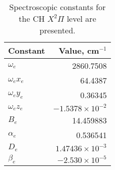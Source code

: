 \begin{table}
  \caption[Spectroscopic constants]{Spectroscopic constants for the CH \(X^2\Pi\) level are presented.}
  \begin{center}
    \begin{tabular}{lr}
      Constant & Value, cm\(^{-1}\) \tabularnewline
      \hline\hline
      \(\omega_e\) & 2860.7508 \tabularnewline
      \(\omega_ex_e\) & 64.4387 \tabularnewline
      \(\omega_ey_e\) & 0.36345 \tabularnewline
      \(\omega_ez_e\) & \(-1.5378 \times 10^{-2}\) \tabularnewline
      \(B_e\) & 14.459883 \tabularnewline
      \(\alpha_e\) & 0.536541 \tabularnewline
      \(D_e\) & \(1.47436 \times 10^{-3}\) \tabularnewline
      \(\beta_e\) & \(-2.530 \times 10^{-5}\) \tabularnewline
    \end{tabular}
  \end{center}
  \label{tab:spectroscopicConstants}
\end{table}

